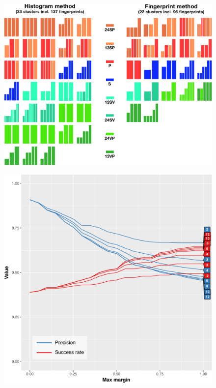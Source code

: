 \documentclass[thesis.tex]{subfiles}
\begin{document}
\begin{figure}[h]
\centering \includegraphics[page=1,width=\textwidth,height=\textheight,keepaspectratio=true]{images/experiment/clusters}
\end{figure}
\begin{figure}[h]
\centering \includegraphics[page=1,width=\textwidth,height=\textheight,keepaspectratio=true]{images/experiment/match_precision}
\end{figure}
\end{document}
